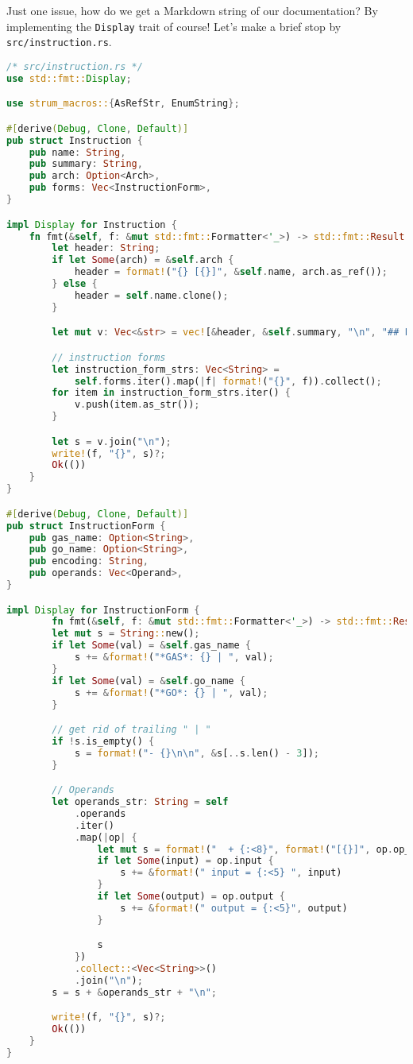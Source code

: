 Just one issue, how do we get a Markdown string of our documentation? By implementing the \texttt{Display} trait of course! Let's make a brief stop by \texttt{src/instruction.rs}.

\begin{lstlisting}[language=rust]
/* src/instruction.rs */
use std::fmt::Display;

use strum_macros::{AsRefStr, EnumString};

#[derive(Debug, Clone, Default)]
pub struct Instruction {
    pub name: String,
    pub summary: String,
    pub arch: Option<Arch>,
    pub forms: Vec<InstructionForm>,
}

impl Display for Instruction {
    fn fmt(&self, f: &mut std::fmt::Formatter<'_>) -> std::fmt::Result {
        let header: String;
        if let Some(arch) = &self.arch {
            header = format!("{} [{}]", &self.name, arch.as_ref());
        } else {
            header = self.name.clone();
        }

        let mut v: Vec<&str> = vec![&header, &self.summary, "\n", "## Forms", "\n"];

        // instruction forms
        let instruction_form_strs: Vec<String> =
            self.forms.iter().map(|f| format!("{}", f)).collect();
        for item in instruction_form_strs.iter() {
            v.push(item.as_str());
        }

        let s = v.join("\n");
        write!(f, "{}", s)?;
        Ok(())
    }
}

#[derive(Debug, Clone, Default)]
pub struct InstructionForm {
    pub gas_name: Option<String>,
    pub go_name: Option<String>,
    pub encoding: String,
    pub operands: Vec<Operand>,
}

impl Display for InstructionForm {
        fn fmt(&self, f: &mut std::fmt::Formatter<'_>) -> std::fmt::Result {
        let mut s = String::new();
        if let Some(val) = &self.gas_name {
            s += &format!("*GAS*: {} | ", val);
        }
        if let Some(val) = &self.go_name {
            s += &format!("*GO*: {} | ", val);
        }

        // get rid of trailing " | "
        if !s.is_empty() {
            s = format!("- {}\n\n", &s[..s.len() - 3]);
        }

        // Operands
        let operands_str: String = self
            .operands
            .iter()
            .map(|op| {
                let mut s = format!("  + {:<8}", format!("[{}]", op.op_type.as_ref()));
                if let Some(input) = op.input {
                    s += &format!(" input = {:<5} ", input)
                }
                if let Some(output) = op.output {
                    s += &format!(" output = {:<5}", output)
                }

                s
            })
            .collect::<Vec<String>>()
            .join("\n");
        s = s + &operands_str + "\n";

        write!(f, "{}", s)?;
        Ok(())
    }
}
\end{lstlisting}

